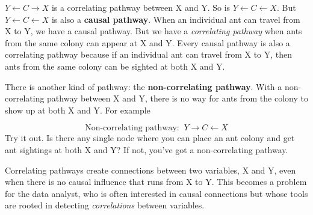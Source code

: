\documentclass[
  letterpaper,
  DIV=11,
  numbers=noendperiod,
  oneside]{scrartcl}
\begin{document}
\(Y \leftarrow C \rightarrow X\) is a correlating pathway between X and
Y. So is \(Y \leftarrow C \leftarrow X\). But
\(Y \leftarrow C \leftarrow X\) is also a \textbf{causal pathway}. When
an individual ant can travel from X to Y, we have a causal pathway. But
we have a \emph{correlating pathway} when ants from the same colony can
appear at X and Y. Every causal pathway is also a correlating pathway
because if an individual ant can travel from X to Y, then ants from the
same colony can be sighted at both X and Y.

There is another kind of pathway: the \textbf{non-correlating pathway}.
With a non-correlating pathway between X and Y, there is no way for ants
from the colony to show up at both X and Y. For example

\[\text{Non-correlating pathway: }\ Y \rightarrow C \leftarrow X\] Try
it out. Is there any single node where you can place an ant colony and
get ant sightings at both X and Y? If not, you've got a non-correlating
pathway.

Correlating pathways create connections between two variables, X and Y,
even when there is no causal influence that runs from X to Y. This
becomes a problem for the data analyst, who is often interested in
causal connections but whose tools are rooted in detecting
\emph{correlations} between variables.
\end{document}
